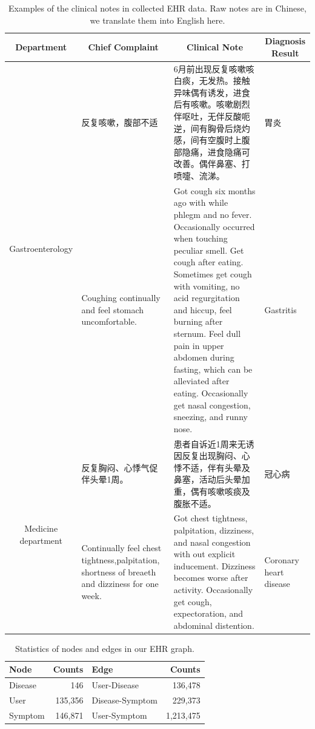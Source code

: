 \documentclass[sigconf]{acmart}
\begin{document}
\begin{CJK*}{UTF8}{gbsn}
\begin{table}[t]
  \centering
  \caption{Examples of the clinical notes in collected EHR data. Raw notes are in Chinese, we translate them into English here.}
    \begin{tabular}{|c|p{7em}|p{30em}|p{6.5em}|}
    \hline
    Department & \multicolumn{1}{c|}{Chief Complaint} & \multicolumn{1}{c|}{Clinical Note} & \multicolumn{1}{c|}{Diagnosis Result} \bigstrut\\
    \hline
    \multicolumn{1}{|c|}{\multirow{2}[4]{*}{Gastroenterology}} & 反复咳嗽，腹部不适 & 6月前出现反复咳嗽咳白痰，无发热。接触异味偶有诱发，进食后有咳嗽。咳嗽剧烈伴呕吐，无伴反酸呃逆，间有胸骨后烧灼感，间有空腹时上腹部隐痛，进食隐痛可改善。偶伴鼻塞、打喷嚏、流涕。 & \multicolumn{1}{l|}{胃炎} \bigstrut\\
\cline{2-4}          & Coughing continually and feel stomach uncomfortable. & Got cough six months ago with while phlegm and no fever. Occasionally occurred when touching peculiar smell. Get cough after eating. Sometimes get cough with vomiting, no acid regurgitation and hiccup, feel burning after sternum. Feel dull pain in upper abdomen during fasting, which can be alleviated after eating. Occasionally get nasal congestion, sneezing, and runny nose.  & \multicolumn{1}{l|}{Gastritis} \bigstrut\\
    \hline
    \multicolumn{1}{|c|}{\multirow{2}[4]{*}{Medicine department}} & 反复胸闷、心悸气促伴头晕1周。 & 患者自诉近1周来无诱因反复出现胸闷、心悸不适，伴有头晕及鼻塞，活动后头晕加重，偶有咳嗽咳痰及腹胀不适。 & \multicolumn{1}{l|}{冠心病} \bigstrut\\
\cline{2-4}          & Continually feel chest tightness,palpitation, shortness of breaeth and dizziness for one week. & Got chest tightness, palpitation, dizziness, and nasal congestion with out explicit inducement. Dizziness becomes worse after activity. Occasionally get cough, expectoration, and abdominal distention. & Coronary heart disease \newline{}\newline{} \bigstrut\\
    \hline
    \end{tabular}%
  \label{tab:example_benchmark}%
\end{table}%
\end{CJK*}



\begin{table}[t]
  \centering
  \caption{Statistics of nodes and edges in our EHR graph.}
    \begin{tabular}{|lr||lr|}
    \hline
    Node & \multicolumn{1}{r||}{Counts} & Edge & \multicolumn{1}{r|}{Counts} \\
    \hline
Disease & 146  & User-Disease & 136,478 \\
        User  & 135,356 & Disease-Symptom & 229,373 \\
       Symptom & 146,871 & User-Symptom & 1,213,475 \\
    \hline
    \end{tabular}%
  \label{tab:datastat}%
\end{table}%
\end{document}
